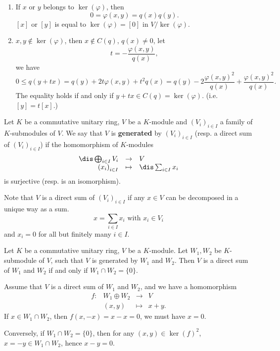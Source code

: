 \begin{proofenv}
    \quad
    \begin{enumerate}[label=(\roman*)]
        \item If $x$ or $y$ belongs to $\ker(\varphi)$, then
        $$ 0 =\varphi(x,y) = q(x)q(y).$$
        $[x]$ or $[y]$ is equal to $\ker(\varphi) =[0]$ in $V/\ker(\varphi)$.
        \item $x,y\notin \ker(\varphi)$, then $x\notin C(q)$, $q(x)\neq 0$, let
        $$ t = - \frac{\varphi(x,y)}{q(x)},$$
        we have 
        $$ 0\le q(y+tx) = q(y) +2t\varphi(x,y) +t^2q(x) = q(y) - 2\frac{\varphi(x,y)^2}{q(x)} + \frac{\varphi(x,y)^2}{q(x)}.$$
        The equality holds if and only if $y +tx \in C(q) = \ker(\varphi).$ (i.e. $[y] = t[x]$.)
    \end{enumerate}
\end{proofenv}
\begin{definitionenv}
    Let $K$ be a commutative unitary ring, $V$ be a $K$-module and $\left(V_i\right)_{i\in I}$ a family of $K$-submodules of $V$.
    We say that $V$ is \textbf{generated} by $\left(V_i\right)_{i\in I}$ (resp. a direct sum of $\left(V_i\right)_{i\in I}$) if the homomorphism of $K$-modules
    $$ \begin{array}{rcl}
        \dis \bigoplus _{i\in I} V_i & \rightarrow & V\\
        \left(x_i\right)_{i\in I} & \mapsto & \dis \sum_{i\in I} x_i
    \end{array}$$
    is surjective (resp. is an isomorphism). 
    
    \quad Note that $V$ is a direct sum of $\left(V_i\right)_{i\in I}$ if any $x\in V$ can be decomposed in a unique way as a sum.
    $$ x = \sum_{i\in I} x_i \text{ with } x_i \in V_i$$
    and $x_i=0$ for all but finitely many $i\in I$.
\end{definitionenv}
\begin{propositionenv}
    Let $K$ be a commutative unitary ring, $V$ be a $K$-module. Let $W_1,W_2$ be $K$-submodule of $V$, such that $V$ is generated by $W_1$ and $W_2$. 
    Then $V$ is a direct sum of $W_1$ and $W_2$ if and only if $W_1\cap W_2 =\{0\}$.
\end{propositionenv}
\begin{proofenv}
    Assume that $V$ is a direct sum of $W_1$ and $W_2$, and we have a homomorphism
    $$ \begin{array}{rrcl}
        f: & W_1\oplus W_2 & \rightarrow & V\\
        & (x,y) & \mapsto & x+y.
    \end{array}$$
    If $x\in W_1\cap W_2$, then $f(x, -x) = x - x = 0$, we must have $x = 0$.

    \quad Conversely, if $W_1\cap W_2 =\{0\}$, then for any $(x,y)\in \ker(f)^2$, $x = - y \in W_1\cap W_2$, hence $x - y = 0$.
\end{proofenv}
